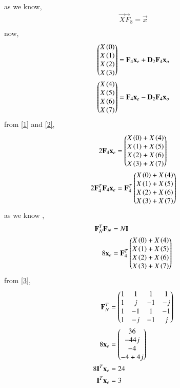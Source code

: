 \documentclass[journal,12pt,twocolumn]{IEEEtran}
\begin{document}
as we know,
\begin{align}
    \vec{X}\vec{F}_8=\vec{x}\\
\end{align}
now,
\begin{align}
    \begin{pmatrix}X\left(0\right)\\X\left(1\right)\\X\left(2\right)\\X\left(3\right)\end{pmatrix}&=\mathbf{F}_{4}\mathbf{x}_{e} + \mathbf{D}_2\mathbf{F}_{4}\mathbf{x}_{o}  \label{1}\\
    \begin{pmatrix}X\left(4\right)\\X\left(5\right)\\X\left(6\right)\\X\left(7\right)\end{pmatrix}&=\mathbf{F}_{4}\mathbf{x}_{e} - \mathbf{D}_2\mathbf{F}_{4}\mathbf{x}_{o}  \label{2}
\end{align}
from \eqref{1} and \eqref{2},
\begin{align}
    2\mathbf{F}_{4}\mathbf{x}_{e} &=  \begin{pmatrix}X\left(0\right)+X\left(4\right)\\X\left(1\right)+X\left(5\right)\\X\left(2\right)+X\left(6\right)\\X\left(3\right)+X\left(7\right)\end{pmatrix} \\
    2\mathbf{F}_{4}^{T}\mathbf{F}_{4}\mathbf{x}_{e} &=  \mathbf{F}_{4}^{T}\begin{pmatrix}X\left(0\right)+X\left(4\right)\\X\left(1\right)+X\left(5\right)\\X\left(2\right)+X\left(6\right)\\X\left(3\right)+X\left(7\right)\end{pmatrix}
\end{align}
as we know ,
\begin{align}
    \mathbf{F}_{N}^{T}\mathbf{F}_{N} &= N \mathbf{I} \\
    8\mathbf{x}_{e} &=\mathbf{F}_{4}^{T}\begin{pmatrix}X\left(0\right)+X\left(4\right)\\X\left(1\right)+X\left(5\right)\\X\left(2\right)+X\left(6\right)\\X\left(3\right)+X\left(7\right)\end{pmatrix}
\end{align}
from \eqref{3},
\begin{align}
    \mathbf{F}_{N}^{T} &= \begin{pmatrix}1 & 1 & 1 & 1 \\ 1 & j & -1 & -j \\ 1 & -1 & 1 & -1\\ 1 & -j  & -1 & j\end{pmatrix}\\
    8\mathbf{x}_{e} &=\begin{pmatrix}36\\-44j\\-4\\-4+4j\end{pmatrix}\\
    8\mathbf{I}^{T}\mathbf{x}_{e} &=24\\
    \mathbf{I}^{T}\mathbf{x}_{e} &=3
\end{align}
\end{document}
